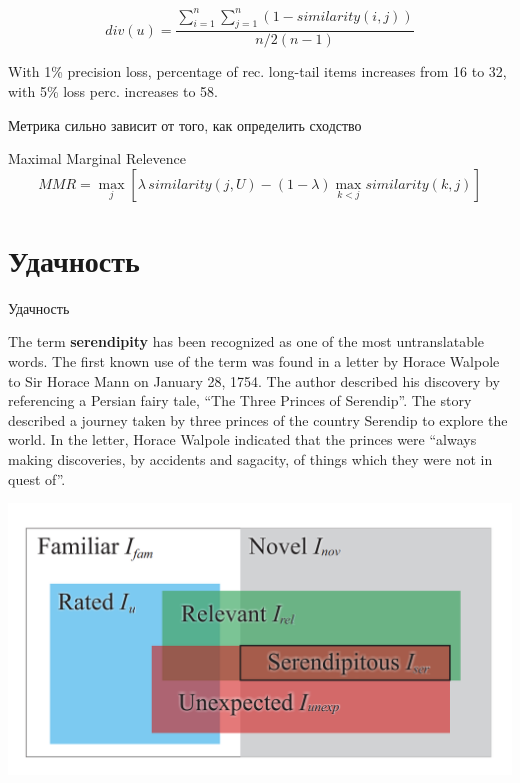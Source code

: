 \documentclass[11pt,aspectratio=169,handout]{beamer}
\begin{document}
\begin{frame}

\[
div(u) = \frac{\sum_{i=1}^n \sum_{j=1}^n (1 - similarity(i, j))}{n/2 (n-1)} 
\]

\vfill

\begin{tcolorbox}[colback=gray!5,colframe=gray!80,title=]
With 1\% precision loss, percentage of rec. long-tail items increases from 16 to 32, with 5\% loss perc. increases to 58.
\end{tcolorbox}

\vfill

\begin{tcolorbox}[colback=warn!5,colframe=warn!80,title=]
Метрика сильно зависит от того, как определить сходство
\end{tcolorbox}

\end{frame}

\begin{frame}
Maximal Marginal Relevence \cite{CARBONELL}
\[
MMR = \max_j \left[ \lambda \, similarity(j, U) - (1 - \lambda) \max_{k < j} similarity(k, j) \right]
\]
\end{frame}

\section{Удачность}

\begin{frame}{Удачность \cite{SILVIERA}}

The term {\bf serendipity} has been recognized as one of the most untranslatable words. 
The first known use of the term was found in a letter by Horace Walpole to Sir Horace Mann on January 28, 1754. 
The author described his discovery by referencing a Persian fairy tale, ``The Three Princes of Serendip''. 
The story described a journey taken by three princes of the country Serendip to explore the world. 
In the letter, Horace Walpole indicated that the princes were ``always making discoveries, by accidents and sagacity, of things which they were not in quest of''. \cite{KOTKOV}

\begin{center}
\includegraphics[scale=0.3]{images/serendipity.png}
\end{center}

\end{frame}
\end{document}
